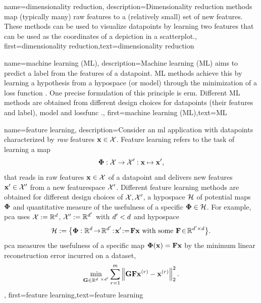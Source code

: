 {name={dimensionality reduction},
	description={Dimensionality reduction methods 
		map (typically many) raw \gls{feature}s to a (relatively small) set of 
		new \gls{feature}s. These methods can be used to visualize \gls{datapoint}s 
		by learning two \gls{feature}s that can be used as the coordinates of a 
		depiction in a \gls{scatterplot}.}, first={dimensionality reduction},text={dimensionality reduction}
} 



{name={machine learning (ML)},
		 description={Machine learning (ML) aims to predict 
	 a \gls{label} from the \gls{feature}s of a \gls{datapoint}. ML methods achieve 
	 this by learning a \gls{hypothesis} from a \gls{hypospace} (or \gls{model}) 
	 through the minimization of a \gls{loss} function \cite{MLBasics,HastieWainwrightBook}. 
	 One precise formulation of this principle is \gls{erm}. Different ML methods are 
	 obtained from different design choices for \gls{datapoint}s (their \gls{feature}s and \gls{label}), 
	 \gls{model} and \gls{lossfunc} \cite[Ch. 3]{MLBasics}.},
	first={machine learning (ML)},text={ML}
} 


{name={feature learning},
	description={Consider an \gls{ml} application with \gls{datapoint}s characterized by 
		\emph{raw} \gls{feature}s ${\bf x} \in \mathcal{X}$. Feature learning 
		refers to the task of learning a map 
		$${\bf \Phi}: \mathcal{X} \rightarrow \mathcal{X}': {\bf x} \mapsto {\bf x}',$$ 
		that reads in raw \gls{feature}s ${\bf x} \in \mathcal{X}$ of a \gls{datapoint} and delivers new 
		\gls{feature}s ${\bf x}' \in \mathcal{X}'$ from a new \gls{featurespace} $\mathcal{X}'$. 
		Different \gls{feature} learning methods are obtained for different design 
		choices of $\mathcal{X},\mathcal{X}'$, a \gls{hypospace} $\mathcal{H}$ 
		of potential maps ${\bf \Phi}$ and quantitative measure of the usefulness of 
		a specific ${\bf \Phi} \in \mathcal{H}$. For example, \gls{pca} 
		uses $\mathcal{X} := \mathbb{R}^{d}$, $\mathcal{X}' := \mathbb{R}^{d'}$ 
		with $d' < d$ and \gls{hypospace} 
		$$\hypospace\defeq \big\{ \featuremapvec: \mathbb{R}^{\dimlocalmodel}
		\!\rightarrow\! \mathbb{R}^{\dimlocalmodel'}\!:\!\featurevec'\!\defeq\!\mF \featurevec \mbox{ with some } \mF \!\in\! \mathbb{R}^{\dimlocalmodel' \times \dimlocalmodel} \big\}.$$ \Gls{pca} measures the usefulness of a specific map ${\bf \Phi}({\bf x})= \mathbf{F} {\bf x}$ 
	by the minimum linear reconstruction error incurred on a \gls{dataset}, 
$$ \min_{\mG \in \mathbb{R}^{\dimlocalmodel \times \dimlocalmodel'}} \sum_{\sampleidx=1}^{\samplesize} \normgeneric{\mG \mF \featurevec^{(\sampleidx)} - \featurevec^{(\sampleidx)}}{2}^{2}.$$ }, 
	first={feature learning},text={feature learning}
} 

